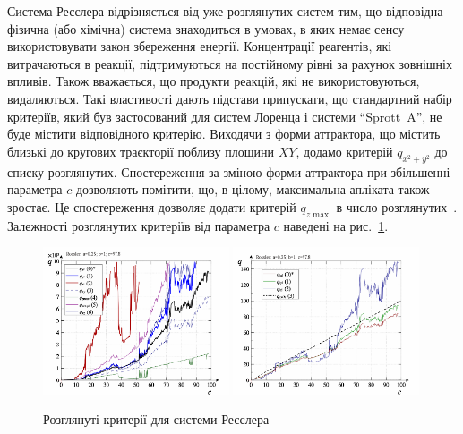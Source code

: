 Система Ресслера відрізняється від уже розглянутих систем
тим, що відповідна фізична (або хімічна) система знаходиться в
умовах, в яких немає сенсу використовувати закон збереження
енергії. Концентрації реагентів, які витрачаються в реакції,
підтримуються на постійному рівні за рахунок зовнішніх
впливів. Також вважається,  що продукти
реакцій, які не використовуються, видаляються.
Такі властивості дають підстави
припускати, що стандартний набір критеріїв, який був
застосований для систем Лоренца і системи ``Sprott~A'', не буде
містити відповідного критерію. Виходячи з форми аттрактора,
що містить близькі до кругових траєкторії поблизу площини
$XY$, додамо критерій
$q_{x^2 + y^2} $ до списку розглянутих. Спостереження за зміною
форми аттрактора при збільшенні параметра
$c$ дозволяють помітити, що, в цілому, максимальна апліката
також зростає. Це спостереження дозволяє додати критерій
$ q_{z \max{}} $ в число розглянутих~\cite{atu_ISDMCI2012, atu_asau14}. Залежності
розглянутих критеріїв від параметра
$ c $ наведені на рис.~\ref{atu:f:ross_q}.


\begin{figure}[ht!]
\begin{center}
  \includegraphics[width=0.49\textwidth]{p/cha/ross/ross_q-p_q.png}
  \hfill
  \includegraphics[width=0.49\textwidth]{p/cha/ross/ross_q-p_q1.png}
\end{center}
\caption{Розглянуті критерії для системи Ресслера}
\label{atu:f:ross_q}
\end{figure}

